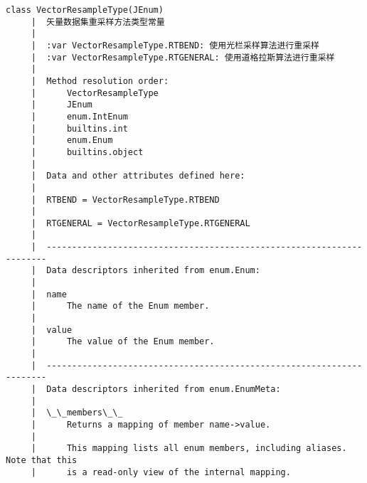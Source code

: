 \documentclass[11pt]{article}
\begin{document}
\begin{Verbatim}[commandchars=\\\{\}]
    class VectorResampleType(JEnum)
     |  矢量数据集重采样方法类型常量
     |  
     |  :var VectorResampleType.RTBEND: 使用光栏采样算法进行重采样
     |  :var VectorResampleType.RTGENERAL: 使用道格拉斯算法进行重采样
     |  
     |  Method resolution order:
     |      VectorResampleType
     |      JEnum
     |      enum.IntEnum
     |      builtins.int
     |      enum.Enum
     |      builtins.object
     |  
     |  Data and other attributes defined here:
     |  
     |  RTBEND = VectorResampleType.RTBEND
     |  
     |  RTGENERAL = VectorResampleType.RTGENERAL
     |  
     |  ----------------------------------------------------------------------
     |  Data descriptors inherited from enum.Enum:
     |  
     |  name
     |      The name of the Enum member.
     |  
     |  value
     |      The value of the Enum member.
     |  
     |  ----------------------------------------------------------------------
     |  Data descriptors inherited from enum.EnumMeta:
     |  
     |  \_\_members\_\_
     |      Returns a mapping of member name->value.
     |      
     |      This mapping lists all enum members, including aliases. Note that this
     |      is a read-only view of the internal mapping.
    

\end{Verbatim}
\end{document}
